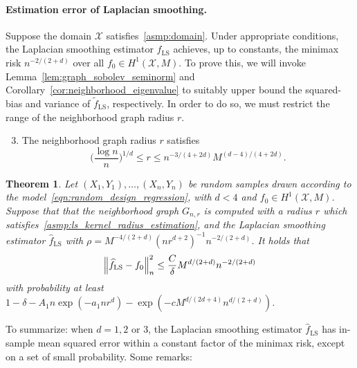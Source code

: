 \documentclass[twoside]{article}
\newcommand{\1}{\mathbf{1}}
\newcommand{\Xset}{\mathcal{X}}
\newcommand{\wt}[1]{\widetilde{#1}}
\newcommand{\wh}[1]{\widehat{#1}}
\newcommand{\LS}{\mathrm{LS}}
\newtheorem{theorem}{Theorem}
\theoremstyle{definition}
\theoremstyle{remark}
\begin{document}
\paragraph{Estimation error of Laplacian smoothing.} 
Suppose the domain $\Xset$ satisfies~\ref{asmp:domain}. Under appropriate conditions, the Laplacian smoothing estimator $\wh{f}_{\LS}$ achieves, up to constants, the minimax risk $n^{-2/(2 + d)}$ over all $f_0 \in H^1(\Xset,M)$. To prove this, we will invoke Lemma~\ref{lem:graph_sobolev_seminorm} and Corollary~\ref{cor:neighborhood_eigenvalue} to suitably upper bound the squared-bias and variance of $\wt{f}_{\LS}$, respectively. In order to do so, we must restrict the range of the neighborhood graph radius $r$. 
\begin{enumerate}[label=(R\arabic*)]
	\setcounter{enumi}{2}
	\item 
	\label{asmp:ls_kernel_radius_estimation}
	The neighborhood graph radius $r$ satisfies
	\begin{equation*}
	\biggl(\frac{\log n}{n}\biggr)^{1/d} \leq r \leq n^{-3/(4 + 2d)} M^{(d - 4)/(4 + 2d)}.
	\end{equation*}
\end{enumerate}
\begin{theorem}
	\label{thm:laplacian_smoothing_estimation1}
	Let $(X_1,Y_1),\ldots,(X_n,Y_n)$ be random samples drawn according to the model~\eqref{eqn:random_design_regression}, with $d < 4$ and $f_0 \in H^1(\Xset,M)$. Suppose that that the neighborhood graph $G_{n,r}$ is computed with a radius $r$ which satisfies~\ref{asmp:ls_kernel_radius_estimation},  and the Laplacian smoothing estimator $\wh{f}_{\LS}$ with $\rho = M^{-4/(2 + d)} (nr^{d + 2})^{-1} n^{-2/(2 + d)}$. It holds that
	\begin{equation*}
	\Bigl\|\wh{f}_{\LS} - f_0\Bigr\|_n^2 \leq \frac{C}{\delta} M^{d/(2 + d)} n^{-2/(2 + d)}
	\end{equation*}
	with probability at least $1 - \delta -  A_1n\exp(-a_1nr^d) - \exp(-c M^{d/(2d + 4)} n^{d/(2+d)})$.
\end{theorem}
To summarize: when $d = 1,2$ or $3$, the Laplacian smoothing estimator $\wh{f}_{\LS}$ has in-sample mean squared error within a constant factor of the minimax risk, except on a set of small probability. Some remarks:
\end{document}
